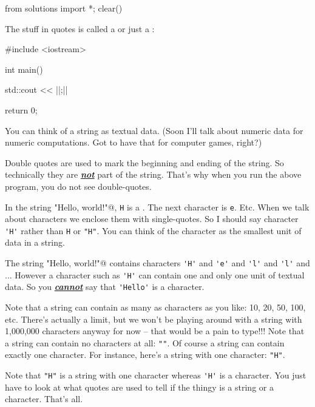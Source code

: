 \begin{python0}
from solutions import *; clear()
\end{python0}

The stuff in quotes is called a  or just a :
\begin{consolethree}[escapeinside=||]
#include <iostream>

int main()
{
    std::cout << ||;||

    return 0;
}
\end{consolethree}

You can think of a string as textual data. 
(Soon I'll talk about numeric data for numeric computations. 
Got to have that for computer games, right?)

Double quotes are used to mark the beginning and ending of the string. 
So technically they are \textit{\textbf{\underline{not}}} part of the string. 
That's why when you run the above program, you do not see double-quotes.



In the string 
\verb@"Hello, world!\n"@, 
\verb!H! is a . 
The next character is \verb!e!. Etc. 
When we talk about characters we enclose them with single-quotes. 
So I should say character \verb!'H'! rather than 
\verb!H! or \verb!"H"!. 
You can think of the character as the smallest unit of data in a string. 

The string \verb@"Hello, world!\n"@ contains characters 
\verb!'H'! and \verb!'e'! and \verb!'l'! and \verb!'l'! and 
... 
However a character such as 
\verb!'H'! can contain one and only one unit of textual data. 
So you \textit{\textbf{\underline{cannot}}} say that \verb!'Hello'! is a character. 

Note that a string can contain as many as characters as you like: 
10, 20, 50, 100, etc. 
There's actually a limit, but we won't be playing around with a string with 
1,000,000 characters anyway for now --
that would be a pain to type!!! 
Note that a string can contain no characters at all: 
\verb!""!. 
Of course a string can contain exactly one character. 
For instance, here's a string with one character: \verb!"H"!. 

Note that \verb!"H"! is a string with one character whereas 
\verb!'H'! is a character. 
You just have to look at what quotes are used to tell if the thingy is a 
string or a character. That's all.




